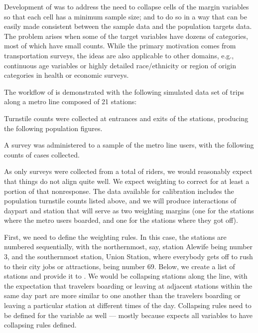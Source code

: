 Development of  was to address the need
to collapse cells of the margin variables so that each cell has a minimum sample size;
and to do so in a way that can be easily made consistent between the sample data
and the population targets data. The problem arises when some of the target
variables have dozens of categories, most of which have small counts.
While the primary motivation comes from transportation surveys,
the ideas are also applicable to other domains, e.g.,
continuous age variables or highly detailed race/ethnicity or region of origin
categories in health or economic surveys.

The workflow of  is demonstrated with the following
simulated data set of trips along a metro line composed of 21 stations:

\begin{stlog}
\nullskip
\end{stlog}

Turnstile counts were collected at entrances and exits of the stations, producing the following
population figures.

\noindent
\begin{stlog}
\nullskip
\end{stlog}

A survey was administered to a sample of the metro line users, with the following counts
of cases collected.


\noindent
\begin{stlog}
\nullskip
\end{stlog}

As only \nullskip surveys were collected from a total of
\nullskip riders, we would reasonably expect
that things do not align quite well. We expect weighting to correct for at least a portion of
that nonresponse. The data available for calibration includes the population turnstile counts
listed above, and we will produce interactions of daypart and station that will serve as two
weighting margins (one for the stations where the metro users boarded, and one for the stations
where they got off).

First, we need to define the weighting rules. In this case, the stations are numbered sequentially,
with the northernmost, say, station Alewife being number 3, and the southernmost station,
Union Station, where everybody gets off to rush to their city jobs or attractions, being number 69.
Below, we create a list of stations and provide it to .
We would be collapsing stations along the line, with the expectation that travelers boarding or leaving
at adjacent stations within the same day part are more similar to one another than the travelers
boarding or leaving a particular station at different times of the day. Collapsing rules
need to be defined for the  variable as well --- mostly because 
expects all variables to have collapsing rules defined.

